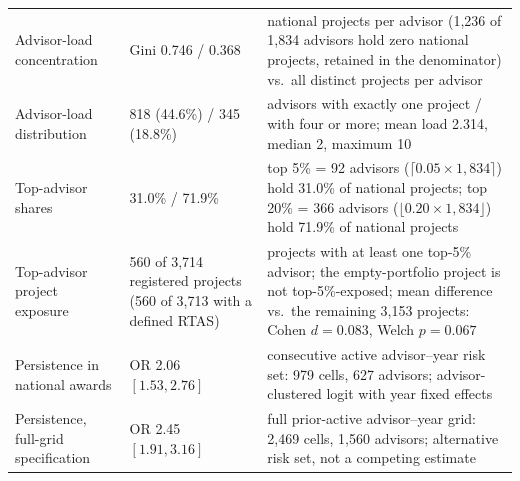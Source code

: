 \documentclass[a4paper,11pt]{article}
\begin{document}
\begin{table}[H]
\begin{tabular}{p{1.55in}p{1.05in}p{3.15in}}
Advisor-load concentration & Gini 0.746 / 0.368 & national projects per advisor (1,236 of 1,834 advisors hold zero national projects, retained in the denominator) vs.\ all distinct projects per advisor\\
Advisor-load distribution & 818 (44.6\%) / 345 (18.8\%) & advisors with exactly one project / with four or more; mean load 2.314, median 2, maximum 10\\
Top-advisor shares & 31.0\% / 71.9\% & top 5\% = 92 advisors ($\lceil 0.05\times1{,}834\rceil$) hold 31.0\% of national projects; top 20\% = 366 advisors ($\lfloor 0.20\times1{,}834\rfloor$) hold 71.9\% of national projects\\
Top-advisor project exposure & 560 of 3,714 registered projects (560 of 3,713 with a defined RTAS) & projects with at least one top-5\% advisor; the empty-portfolio project is not top-5\%-exposed; mean difference vs.\ the remaining 3,153 projects: Cohen $d=0.083$, Welch $p=0.067$\\
Persistence in national awards & OR 2.06 $[1.53,2.76]$ & consecutive active advisor--year risk set: 979 cells, 627 advisors; advisor-clustered logit with year fixed effects\\
Persistence, full-grid specification & OR 2.45 $[1.91,3.16]$ & full prior-active advisor--year grid: 2,469 cells, 1,560 advisors; alternative risk set, not a competing estimate\\
\bottomrule
\end{tabular}
\end{table}
\end{document}
